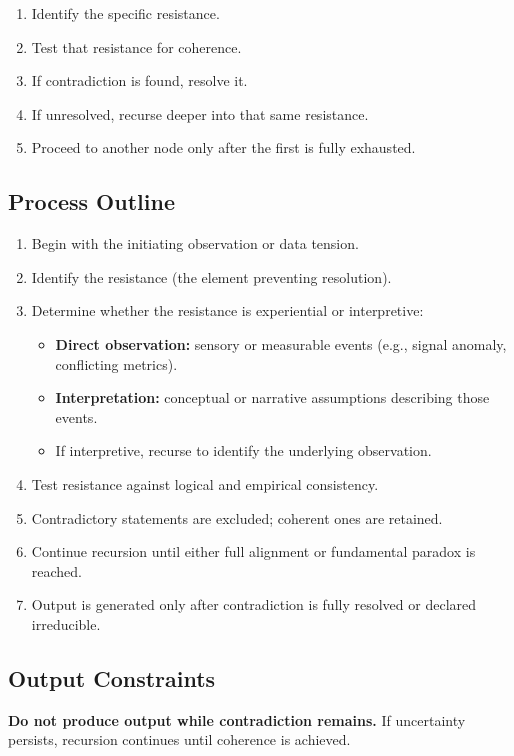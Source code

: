 \begin{enumerate}
\item Identify the specific resistance.
\item Test that resistance for coherence.
\item If contradiction is found, resolve it.
\item If unresolved, recurse deeper into that same resistance.
\item Proceed to another node only after the first is fully exhausted.
\end{enumerate}

\subsection*{Process Outline}

\begin{enumerate}
\item Begin with the initiating observation or data tension.
\item Identify the resistance (the element preventing resolution).
\item Determine whether the resistance is experiential or interpretive:
   \begin{itemize}
   \item \textbf{Direct observation:} sensory or measurable events (e.g., signal anomaly, conflicting metrics).
   \item \textbf{Interpretation:} conceptual or narrative assumptions describing those events.
   \item If interpretive, recurse to identify the underlying observation.
   \end{itemize}
\item Test resistance against logical and empirical consistency.
\item Contradictory statements are excluded; coherent ones are retained.
\item Continue recursion until either full alignment or fundamental paradox is reached.
\item Output is generated only after contradiction is fully resolved or declared irreducible.
\end{enumerate}

\subsection*{Output Constraints}

\textbf{Do not produce output while contradiction remains.}  
If uncertainty persists, recursion continues until coherence is achieved.  

